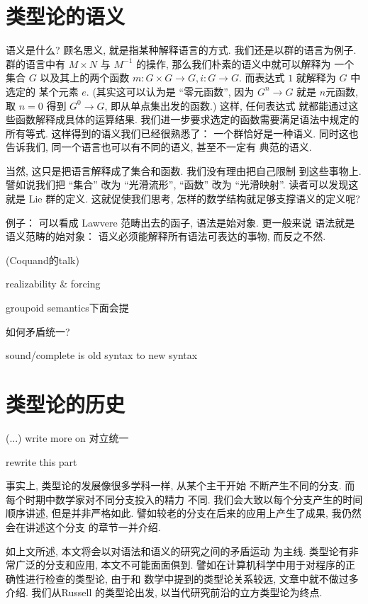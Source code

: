 \documentclass[UTF8]{ctexbook}
\theoremstyle{plain}
\theoremstyle{definition}
\theoremstyle{remark}
\begin{document}
\section{类型论的语义}\label{intro:semantics}
语义是什么? 顾名思义, 就是指某种解释语言的方式.
我们还是以群的语言为例子. 群的语言中有 \(M\times N\)
与 \(M^{-1}\) 的操作, 那么我们朴素的语义中就可以解释为
一个集合 \(G\) 以及其上的两个函数 \(m : G\times G\to G,
i : G \to G\). 而表达式 \(1\) 就解释为 \(G\) 中选定的
某个元素 \(e\). (其实这可以认为是 “零元函数”, 因为
\(G^n \to G\) 就是 \(n\)元函数, 取 \(n = 0\) 得到
\(G^0 \to G\), 即从单点集出发的函数.) 这样, 任何表达式
就都能通过这些函数解释成具体的运算结果.
我们进一步要求选定的函数需要满足语法中规定的所有等式.
这样得到的语义我们已经很熟悉了： 一个群恰好是一种语义.
同时这也告诉我们, 同一个语言也可以有不同的语义, 甚至不一定有
典范的语义.

当然, 这只是把语言解释成了集合和函数. 我们没有理由把自己限制
到这些事物上. 譬如说我们把 “集合” 改为 “光滑流形”,
“函数” 改为 “光滑映射”. 读者可以发现这就是 Lie 群的定义.
这就促使我们思考, 怎样的数学结构就足够支撑语义的定义呢?

例子： 可以看成 Lawvere 范畴出去的函子,
语法是始对象. 更一般来说 语法就是语义范畴的始对象：
语义必须能解释所有语法可表达的事物, 而反之不然.

(Coquand的talk)

realizability \& forcing

groupoid semantics下面会提

如何矛盾统一?

sound/complete is old syntax to new syntax

\section{类型论的历史}\label{intro:unity}
(...) write more on 对立统一

rewrite this part

事实上, 类型论的发展像很多学科一样, 从某个主干开始
不断产生不同的分支. 而每个时期中数学家对不同分支投入的精力
不同. 我们会大致以每个分支产生的时间顺序讲述, 但是并非严格如此.
譬如较老的分支在后来的应用上产生了成果, 我仍然会在讲述这个分支
的章节一并介绍.

如上文所述, 本文将会以对语法和语义的研究之间的矛盾运动
为主线. 类型论有非常广泛的分支和应用, 本文不可能面面俱到.
譬如在计算机科学中用于对程序的正确性进行检查的类型论, 由于和
数学中提到的类型论关系较远, 文章中就不做过多介绍. 我们从Russell
的类型论出发, 以当代研究前沿的立方类型论为终点.
\end{document}

